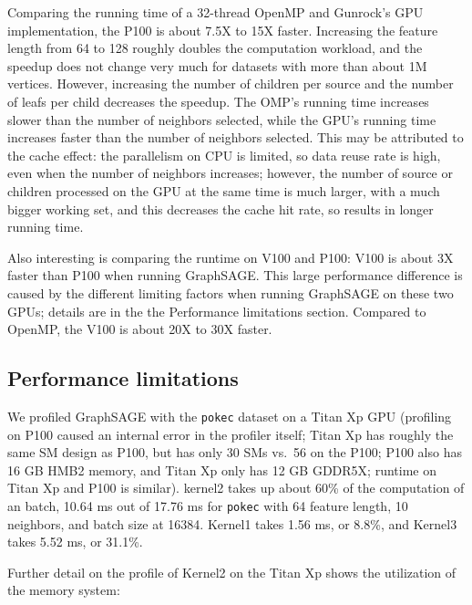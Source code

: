 \documentclass[10pt,oneside]{memoir}
\begin{document}
Comparing the running time of a 32-thread OpenMP and Gunrock's GPU
implementation, the P100 is about 7.5X to 15X faster. Increasing the
feature length from 64 to 128 roughly doubles the computation workload,
and the speedup does not change very much for datasets with more than
about 1M vertices. However, increasing the number of children per source
and the number of leafs per child decreases the speedup. The OMP's
running time increases slower than the number of neighbors selected,
while the GPU's running time increases faster than the number of
neighbors selected. This may be attributed to the cache effect: the
parallelism on CPU is limited, so data reuse rate is high, even when the
number of neighbors increases; however, the number of source or children
processed on the GPU at the same time is much larger, with a much bigger
working set, and this decreases the cache hit rate, so results in longer
running time.

Also interesting is comparing the runtime on V100 and P100: V100 is
about 3X faster than P100 when running GraphSAGE. This large performance
difference is caused by the different limiting factors when running
GraphSAGE on these two GPUs; details are in the the Performance
limitations section. Compared to OpenMP, the V100 is about 20X to 30X
faster.

\hypertarget{performance-limitations-2}{%
\subsection{Performance limitations}\label{performance-limitations-2}}

We profiled GraphSAGE with the \texttt{pokec} dataset on a Titan Xp GPU
(profiling on P100 caused an internal error in the profiler itself;
Titan Xp has roughly the same SM design as P100, but has only 30 SMs
vs.~56 on the P100; P100 also has 16 GB HMB2 memory, and Titan Xp only
has 12 GB GDDR5X; runtime on Titan Xp and P100 is similar). kernel2
takes up about 60\% of the computation of an batch, 10.64 ms out of
17.76 ms for \texttt{pokec} with 64 feature length, 10 neighbors, and
batch size at 16384. Kernel1 takes 1.56 ms, or 8.8\%, and Kernel3 takes
5.52 ms, or 31.1\%.

Further detail on the profile of Kernel2 on the Titan Xp shows the
utilization of the memory system:
\end{document}
